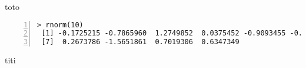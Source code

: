 \documentclass[]{article}
\begin{document}
toto

\begin{Verbatim}[frame=leftline,fontfamily=tt,fontshape=n,numbers=left]
> rnorm(10)
 [1] -0.1725215 -0.7865960  1.2749852  0.0375452 -0.9093455 -0.7670453
 [7]  0.2673786 -1.5651861  0.7019306  0.6347349
\end{Verbatim}
titi
\end{document}

